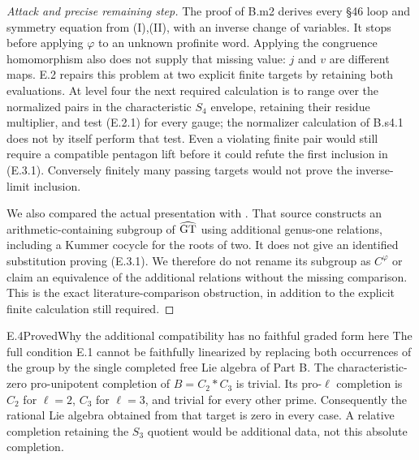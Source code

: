 \begin{proof}[Attack and precise remaining step]
The proof of B.m2 derives every \S46 loop and symmetry equation from
(I),(II), with an inverse change of variables. It stops before applying
$\varphi$ to an unknown profinite word. Applying the congruence
homomorphism also does not supply that missing value: $j$ and $v$
are different maps. E.2 repairs this problem at two explicit finite
targets by retaining both evaluations. At level four the next required
calculation is to range over the normalized pairs in the characteristic
$S_4$ envelope, retaining their residue multiplier, and test (E.2.1)
for every gauge; the normalizer calculation of B.s4.1 does not by itself
perform that test. Even a violating finite pair would still require a
compatible pentagon lift before it could refute the first inclusion
in (E.3.1). Conversely finitely many passing targets would not prove
the inverse-limit inclusion.

We also compared the actual presentation with
\citet[Theorems 1.1--1.4 and relations (III$'$),(IV)]{NakamuraSchneps2000root}.
That source constructs an arithmetic-containing subgroup of $\widehat{\mathrm{GT}}$
using additional genus-one relations, including a Kummer cocycle for
the roots of two. It does not give an identified substitution proving
(E.3.1). We therefore do not rename its subgroup as $C^\varphi$ or
claim an equivalence of the additional relations without the missing
comparison. This is the exact literature-comparison obstruction, in
addition to the explicit finite calculation still required.
\end{proof}

\begin{claim}{E.4}{Proved}{Why the additional compatibility has no faithful graded form here}
The full condition E.1 cannot be faithfully linearized by replacing
both occurrences of the group by the single completed free Lie
algebra of Part B. The characteristic-zero pro-unipotent completion
of $B=C_2*C_3$ is trivial. Its pro-$\ell$ completion is $C_2$ for
$\ell=2$, $C_3$ for $\ell=3$, and trivial for every other prime.
Consequently the rational Lie algebra obtained from that target is
zero in every case. A relative completion retaining the $S_3$ quotient
would be additional data, not this absolute completion.
\end{claim}

